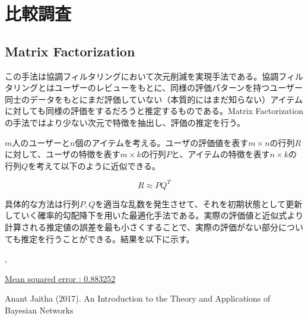 \documentclass[a4j,12pt]{jarticle}
\begin{document}
\section{比較調査}

\subsection{Matrix Factorization}

この手法は協調フィルタリングにおいて次元削減を実現手法である。協調フィルタリングとはユーザーのレビューをもとに、同様の評価パターンを持つユーザー同士のデータをもとにまだ評価していない（本質的にはまだ知らない）アイテムに対しても同様の評価をするだろうと推定するものである。Matrix Factorization の手法ではより少ない次元で特徴を抽出し、評価の推定を行う。

$m$人のユーザーと$n$個のアイテムを考える。ユーザの評価値を表す$m \times n$の行列$R$に対して、ユーザの特徴を表す$m \times k$の行列$P$と、アイテムの特徴を表す$n \times k$の行列$Q$を考えて以下のように近似できる。

$$ R \approx P  Q^T$$

具体的な方法は行列$P,Q$を適当な乱数を発生させて、それを初期状態として更新していく確率的勾配降下を用いた最適化手法である。実際の評価値と近似式より計算される推定値の誤差を最も小さくすることで、実際の評価がない部分についても推定を行うことができる。結果を以下に示す。

\cite{Jアルバート} \cite{Friedman},\cite{Nagarajan}

\underline{Mean squared error :  0.883252}


\begin{thebibliography}{5}
\bibitem{}  Anant Jaitha (2017). An Introduction to the Theory and Applications of Bayesian Networks 
\end{thebibliography}



\end{document}
